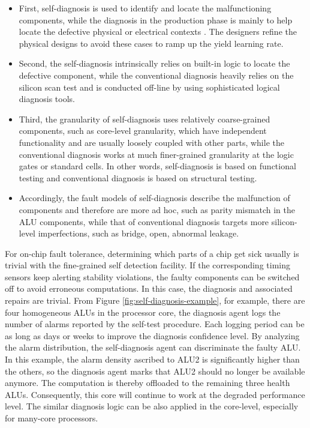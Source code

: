 \begin{itemize}
\item First, self-diagnosis is used to identify and locate the malfunctioning components, while the diagnosis in the production phase is mainly to help locate the defective physical or electrical contexts \cite{aitken2012yield}. The designers refine the physical designs to avoid these cases to ramp up the yield learning rate.

\item Second, the self-diagnosis intrinsically relies on built-in logic to locate the defective component, while the conventional diagnosis heavily relies on the silicon scan test and is conducted off-line by using sophisticated logical diagnosis tools.

\item Third, the granularity of self-diagnosis uses relatively coarse-grained components, such as core-level granularity, which have independent functionality and are usually loosely coupled with other parts, while the conventional diagnosis works at much finer-grained granularity at the logic gates or standard cells. In other words, self-diagnosis is based on functional testing and conventional diagnosis is based on structural testing.

\item Accordingly, the fault models of self-diagnosis describe the malfunction of components and therefore are more ad hoc, such as parity mismatch in the ALU components, while that of conventional diagnosis targets more silicon-level imperfections, such as bridge, open, abnormal leakage.
\end{itemize}

For on-chip fault tolerance, determining which parts of a chip get sick usually is trivial with the fine-grained self detection facility. If the corresponding timing sensors keep alerting stability violations, the faulty components can be switched off to avoid erroneous computations. In this case, the diagnosis and associated repairs are trivial. From Figure \ref{fig:self-diagnosis-example}, for example, there are four homogeneous ALUs in the processor core, the diagnosis agent logs the number of alarms reported by the self-test procedure. Each logging period can be as long as days or weeks to improve the diagnosis confidence level. By analyzing the alarm distribution, the self-diagnosis agent can discriminate the faulty ALU. In this example, the alarm density ascribed to ALU2 is significantly higher than the others, so the diagnosis agent marks that ALU2 should no longer be available anymore. The computation is thereby offloaded to the remaining three health ALUs. Consequently, this core will continue to work at the degraded performance level. The similar diagnosis logic can be also applied in the core-level, especially for many-core processors.

